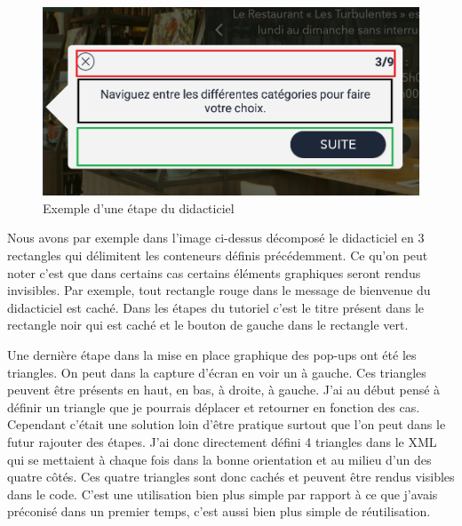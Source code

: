 \clearpage


\begin{figure}[!htp]
  \centering
  \includegraphics[width=115mm,scale=0.5]{images/tutorial_popup.png}
  \caption{Exemple d'une étape du didacticiel}
  \label{fig:boat1}
\end{figure}

Nous avons par exemple dans l'image ci-dessus décomposé le didacticiel en 3 rectangles qui délimitent les conteneurs définis précédemment. Ce qu'on peut noter c'est que dans certains cas certains éléments graphiques seront rendus invisibles. Par exemple, tout rectangle rouge dans le message de bienvenue du didacticiel est caché. Dans les étapes du tutoriel c'est le titre présent dans le rectangle noir qui est caché et le bouton de gauche dans le rectangle vert.

Une dernière étape dans la mise en place graphique des pop-ups ont été les triangles. On peut dans la capture d'écran en voir un à gauche. Ces triangles peuvent être présents en haut, en bas, à droite, à gauche. J'ai au début pensé à définir un triangle que je pourrais déplacer et retourner en fonction des cas. Cependant c'était une solution loin d'être pratique surtout que l'on peut dans le futur rajouter des étapes. J'ai donc directement défini 4 triangles dans le XML qui se mettaient à chaque fois dans la bonne orientation et au milieu d'un des quatre côtés. Ces quatre triangles sont donc cachés et peuvent être rendus visibles dans le code. C'est une utilisation bien plus simple par rapport à ce que j'avais préconisé dans un premier temps, c'est aussi bien plus simple de réutilisation.

